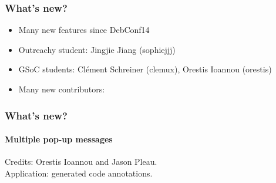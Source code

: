 \documentclass{beamer}
\begin{document}
\begin{frame}
  \frametitle{What's new?}
  \begin{itemize}
    \pause
  \item Many new features since DebConf14
    \pause
  \item Outreachy student: Jingjie Jiang (sophiejjj)
    \pause
  \item GSoC students: Clément Schreiner (clemux), Orestis Ioannou (orestis)
    \pause
  \item Many new contributors:
    \begin{itemize}
    \end{itemize}
  \end{itemize}
\end{frame}

\begin{frame}
  \frametitle{What's new?}
  \framesubtitle{Multiple pop-up messages}
  Credits: Orestis Ioannou and Jason Pleau.\\
  Application: generated code annotations.
  \vspace{7mm}
  ~\\
\end{frame}
\end{document}

